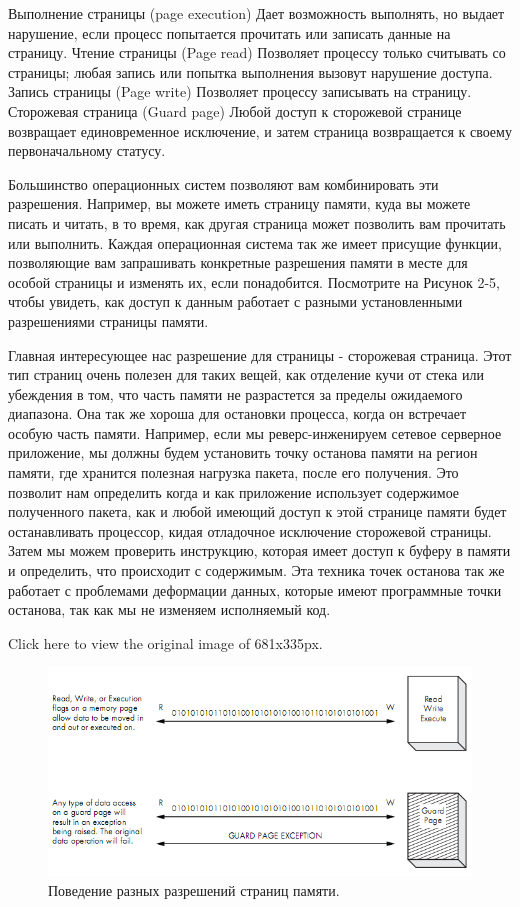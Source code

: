 \documentclass[12pt]{book}
\begin{document}
    Выполнение страницы (page execution) Дает возможность выполнять, но выдает нарушение, если процесс попытается прочитать или записать данные на страницу.
    Чтение страницы (Page read) Позволяет процессу только считывать со страницы; любая запись или попытка выполнения вызовут нарушение доступа.
    Запись страницы (Page write) Позволяет процессу записывать на страницу.
    Сторожевая страница (Guard page) Любой доступ к сторожевой странице возвращает единовременное исключение, и затем страница возвращается к своему первоначальному статусу.

Большинство операционных систем позволяют вам комбинировать эти разрешения. Например, вы можете иметь страницу памяти, куда вы можете писать и читать, в то время, как другая страница может позволить вам прочитать или выполнить. Каждая операционная система так же имеет присущие функции, позволяющие вам запрашивать конкретные разрешения памяти в месте для особой страницы и изменять их, если понадобится. Посмотрите на Рисунок 2-5, чтобы увидеть, как доступ к данным работает с разными установленными разрешениями страницы памяти.

Главная интересующее нас разрешение для страницы - сторожевая страница. Этот тип страниц очень полезен для таких вещей, как отделение кучи от стека или убеждения в том, что часть памяти не разрастется за пределы ожидаемого диапазона. Она так же хороша для остановки процесса, когда он встречает особую часть памяти. Например, если мы реверс-инженируем сетевое серверное приложение, мы должны будем установить точку останова памяти на регион памяти, где хранится полезная нагрузка пакета, после его получения. Это позволит нам определить когда и как приложение использует содержимое полученного пакета, как и любой имеющий доступ к этой странице памяти будет останавливать процессор, кидая отладочное исключение сторожевой страницы. Затем мы можем проверить инструкцию, которая имеет доступ к буферу в памяти и определить, что происходит с содержимым. Эта техника точек останова так же работает с проблемами деформации данных, которые имеют программные точки останова, так как мы не изменяем исполняемый код.


Click here to view the original image of 681x335px.

\begin{figure}
  \center
  \includegraphics{./pic/chap2/6.PNG}
  \caption{Поведение разных разрешений страниц памяти.}
\end{figure}
\end{document}

